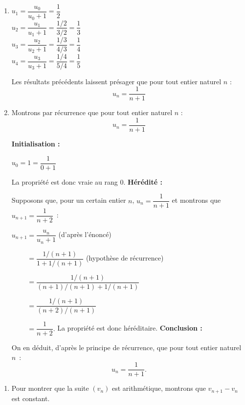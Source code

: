 \begin{corrige}
     \begin{enumerate}
          \item %
          $u_1 =\dfrac{u_0}{u_0+1}= \dfrac{1}{2}$\\
          $u_2 =\dfrac{u_1}{u_1+1}= \dfrac{1/2}{3/2}=\dfrac{1}{3}$\\
          $u_3 =\dfrac{u_2}{u_2+1}= \dfrac{1/3}{4/3}=\dfrac{1}{4}$\\
          $u_4 =\dfrac{u_3}{u_3+1}= \dfrac{1/4}{5/4}=\dfrac{1}{5}$
          \par
          Les résultats précédents laissent présager que pour tout entier naturel $n$ :
          \[ u_n=\dfrac{1}{n+1} \]
          \item %
          Montrons par récurrence que  pour tout entier naturel $n$ :
          \[ u_n=\dfrac{1}{n+1} \]
          \par
          \textbf{Initialisation :}
          \par
          $u_0=1=\dfrac{1}{0+1}$
          \par
          La propriété est donc vraie au rang $0$.
          \medbreak
          \textbf{Hérédité :}
          \par
          Supposons que, pour un certain entier $n$, $u_n=\dfrac{1}{n+1}$ et montrons que $u_{n+1}=\dfrac{1}{n+2}$~:
          \par
          $u_{n+1}=\dfrac{u_n}{u_n+1} $ (d'après l'énoncé)\par
          $\phantom{u_{n+1}}=\dfrac{1/(n+1)}{1+1/(n+1)} $ (hypothèse de récurrence)\par
          $\phantom{u_{n+1}}=\dfrac{1/(n+1)}{(n+1)/(n+1)+1/(n+1)} $\par
          $\phantom{u_{n+1}}=\dfrac{1/(n+1)}{(n+2)/(n+1)} $ \par
          $\phantom{u_{n+1}}=\dfrac{1}{n+2}.$
          \medbreak
          La propriété est donc héréditaire.
          \medbreak
          \textbf{Conclusion :}
          \par
          On en déduit, d'après le principe de récurrence, que pour tout entier naturel $n$~:
          \[ u_n=\dfrac{1}{n+1}. \]
     \end{enumerate}
     \begin{enumerate}
          \item %
          Pour montrer que la suite $(v_n)$ est arithmétique, montrons que $v_{n+1}-v_n$ est constant.

\end{enumerate}
\end{corrige}
